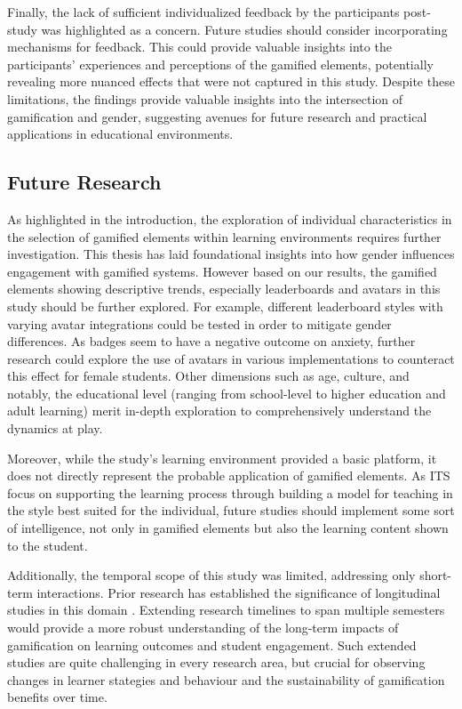 Finally, the lack of sufficient individualized feedback by the participants post-study was highlighted as a concern. Future studies should consider incorporating mechanisms for feedback. This could provide valuable insights into the participants' experiences and perceptions of the gamified elements, potentially revealing more nuanced effects that were not captured in this study.
Despite these limitations, the findings provide valuable insights into the intersection of gamification and gender, suggesting avenues for future research and practical applications in educational environments.
\newpage
\subsection{Future Research}
As highlighted in the introduction, the exploration of individual characteristics in the selection of gamified elements within learning environments requires further investigation.
This thesis has laid foundational insights into how gender influences engagement with gamified systems. 
However based on our results, the gamified elements showing descriptive trends, especially leaderboards and avatars in this study should be further explored.
For example, different leaderboard styles with varying avatar integrations could be tested in order to mitigate gender differences.
As badges seem to have a negative outcome on anxiety, further research could explore the use of avatars in various implementations to counteract this effect for female students.
Other dimensions such as age, culture, and notably, the educational level (ranging from school-level to higher education and adult learning) merit in-depth exploration to comprehensively understand the dynamics at play.

Moreover, while the study's learning environment provided a basic platform, it does not directly represent the probable application of gamified elements. As ITS focus on supporting the learning process through building a model for teaching in the style best suited for the individual, future studies should implement some sort of intelligence, not only in gamified elements but also the learning content shown to the student.

Additionally, the temporal scope of this study was limited, addressing only short-term interactions. Prior research has established the significance of longitudinal studies in this domain \parencite{oliveiraTailoredGamificationEducation2023,dehghanzadehUsingGamificationSupport2024}. Extending research timelines to span multiple semesters would provide a more robust understanding of the long-term impacts of gamification on learning outcomes and student engagement. Such extended studies are quite challenging in every research area, but crucial for observing changes in learner stategies and behaviour and the sustainability of gamification benefits over time.

